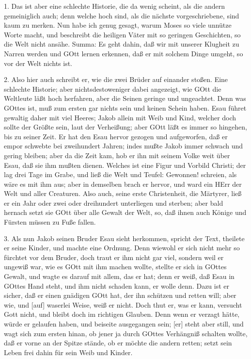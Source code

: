 1. Das ist aber eine schlechte Historie, die da wenig scheint, als die andern gemeiniglich auch; denn welche hoch sind, als die nächste vorgeschriebene, sind kaum zu merken. Nun habe ich genug gesagt, warum Moses so viele unnütze Worte macht, und beschreibt die heiligen Väter mit so geringen Geschichten, so die Welt nicht ansähe. Summa: Es geht dahin, daß wir mit unserer Klugheit zu Narren werden und GOtt lernen erkennen, daß er mit solchem Dinge umgeht, so vor der Welt nichts ist.

2. Also hier auch schreibt er, wie die zwei Brüder auf einander stoßen. Eine schlechte Historie; aber nichtsdestoweniger dabei angezeigt, wie GOtt die Weltleute läßt hoch herfahren, aber die Seinen geringe und ungeachtet. Denn was GOttes ist, muß zum ersten gar nichts sein und keinen Schein haben. Esau führet gewaltig daher mit viel Heeres; Jakob allein mit Weib und Kind, welcher doch sollte der Größte sein, laut der Verheißung; aber GOtt läßt es immer so hingehen, bis zu seiner Zeit. Er hat den Esau hervor gezogen und aufgeworfen, daß er empor schwebte bei zweihundert Jahren; indes mußte Jakob immer schwach und gering bleiben; aber da die Zeit kam, hob er ihn mit seinem Volke weit über Esau, daß sie ihm mußten dienen. Welches ist eine Figur und Vorbild Christi; der lag drei Tage im Grabe, und ließ die Welt und Teufel: Gewonnen! schreien, als wäre es mit ihm aus; aber in demselben brach er hervor, und ward ein HErr der Welt und aller Creaturen. Also auch, seine erste Christenheit, die Märtyrer, ließ er ein Jahr oder zwei oder dreihundert unterliegen und sterben; aber bald hernach setzt sie GOtt über alle Gewalt der Welt, so, daß ihnen auch Könige und Fürsten müssen zu Fuße fallen.

3. Als nun Jakob seinen Bruder Esau sieht herkommen, spricht der Text, theilete er seine Kinder, und machte eine Ordnung. Denn wiewohl er sich nicht mehr so fürchtet vor dem Bruder, doch traut er ihm nicht gar viel, sondern weil er ungewiß war, wie es GOtt mit ihm machen wollte, stellte er sich in GOttes Gewalt, und wagte es darauf mit allem, das er hat; denn er weiß, daß Esau in GOttes Hand steht, und ihm nicht schaden kann, er wolle denn. Dazu ist er sicher, daß er einen gnädigen GOtt hat, der ihn schützen und retten will; aber wie, und [auf] waserlei Weise, weiß er nicht. Doch thut er, was er kann, versucht Gott nicht, und bleibt doch im richtigen Glauben. Denn wenn er verzagt hätte, würde er gelaufen haben, und beiseite ausgegangen sein; [er] steht aber still, und wagt sich zum ersten hinan, ob jener ja durch GOttes Verhängniß schalten wollte, daß er vorne an der Spitze stände, ob er möchte die andern retten; setzt sein Leben frei dahin für sein Weib und Kinder.

